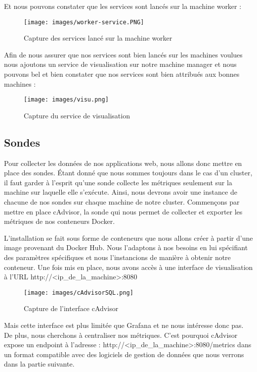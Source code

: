 \documentclass[oneside,12pt]{report}
\begin{document}
Et nous pouvons constater que les services sont lancés sur la machine worker :
\begin{figure}[H]
    \centering
    \texttt{[image: images/worker-service.PNG]}
    \caption{Capture des services lancé sur la machine worker}
    \label{fig:mesh1}
\end{figure}

Afin de nous assurer que nos services sont bien lancés sur les machines voulues nous ajoutons un service de visualisation sur notre machine manager et nous pouvons bel et bien constater que nos services sont bien attribués aux bonnes machines :
\begin{figure}[H]
    \centering
    \texttt{[image: images/visu.png]}
    \caption{Capture du service de visualisation}
    \label{fig:mesh1}
\end{figure}

\subsection{Sondes}

Pour collecter les données de nos applications web, nous allons donc mettre en place des sondes. Étant donné que nous sommes toujours dans le cas d'un cluster, il faut garder à l'esprit qu'une sonde collecte les métriques seulement sur la machine sur laquelle elle s'exécute. Ainsi, nous devrons avoir une instance de chacune de nos sondes sur chaque machine de notre cluster. Commençons par mettre en place cAdvisor, la sonde qui nous permet de collecter et exporter les métriques de nos conteneurs Docker. \newline

L'installation se fait sous forme de conteneurs que nous allons créer à partir d'une image provenant du Docker Hub. Nous l'adaptons à nos besoins en lui spécifiant des paramètres spécifiques et nous l'instancions de manière à obtenir notre conteneur. Une fois mis en place, nous avons accès à une interface de visualisation à l'URL http://<ip\_de\_la\_machine>:8080

\begin{figure}[H]
    \centering
    \texttt{[image: images/cAdvisorSQL.png]}
    \caption{Capture de l'interface cAdvisor}
    \label{fig:mesh1}
\end{figure}

Mais cette interface est plus limitée que Grafana et ne nous intéresse donc pas. De plus, nous cherchons à centraliser nos métriques. C'est pourquoi cAdvisor expose un endpoint à l'adresse : http://<ip\_de\_la\_machine>:8080/metrics dans un format compatible avec des logiciels de gestion de données que nous verrons dans la partie suivante. \newline
\end{document}
